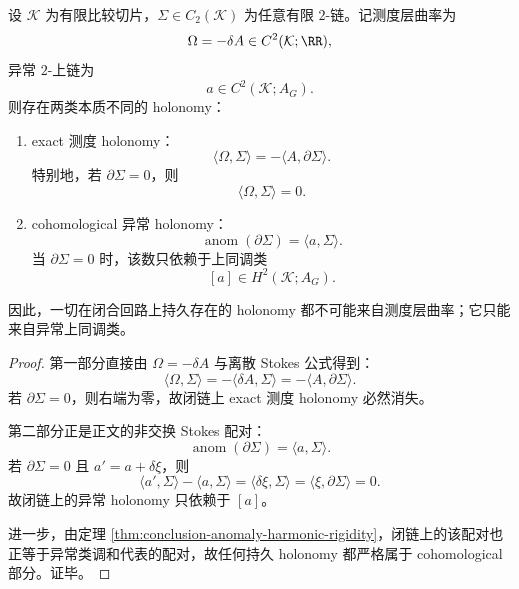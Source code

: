 \begin{theorem}\label{thm:conclusion-observer-holonomy-exact-cohomological-splitting}
设 \(\mathcal K\) 为有限比较切片，\(\Sigma\in C_2(\mathcal K)\) 为任意有限 \(2\)-链。记测度层曲率为
\[
\Omega=-\delta A\in C^2(\mathcal K;\RR),
\]
异常 \(2\)-上链为
\[
a\in C^2(\mathcal K;A_G).
\]
则存在两类本质不同的 holonomy：
\begin{enumerate}
  \item \textnormal{exact 测度 holonomy：}
  \[
  \langle \Omega,\Sigma\rangle=-\langle A,\partial\Sigma\rangle.
  \]
  特别地，若 \(\partial\Sigma=0\)，则
  \[
  \langle \Omega,\Sigma\rangle=0.
  \]
  \item \textnormal{cohomological 异常 holonomy：}
  \[
  \operatorname{anom}(\partial\Sigma)=\langle a,\Sigma\rangle.
  \]
  当 \(\partial\Sigma=0\) 时，该数只依赖于上同调类
  \[
  [a]\in H^2(\mathcal K;A_G).
  \]
\end{enumerate}
因此，一切在闭合回路上持久存在的 holonomy 都不可能来自测度层曲率；它只能来自异常上同调类。
\end{theorem}
\begin{proof}
第一部分直接由 \(\Omega=-\delta A\) 与离散 Stokes 公式得到：
\[
\langle \Omega,\Sigma\rangle
=
-\langle \delta A,\Sigma\rangle
=
-\langle A,\partial\Sigma\rangle.
\]
若 \(\partial\Sigma=0\)，则右端为零，故闭链上 exact 测度 holonomy 必然消失。

第二部分正是正文的非交换 Stokes 配对：
\[
\operatorname{anom}(\partial\Sigma)=\langle a,\Sigma\rangle.
\]
若 \(\partial\Sigma=0\) 且 \(a' = a+\delta\xi\)，则
\[
\langle a',\Sigma\rangle-\langle a,\Sigma\rangle
=
\langle \delta\xi,\Sigma\rangle
=
\langle \xi,\partial\Sigma\rangle
=
0.
\]
故闭链上的异常 holonomy 只依赖于 \([a]\)。

进一步，由定理 \ref{thm:conclusion-anomaly-harmonic-rigidity}，闭链上的该配对也正等于异常类调和代表的配对，故任何持久 holonomy 都严格属于 cohomological 部分。证毕。
\end{proof}
